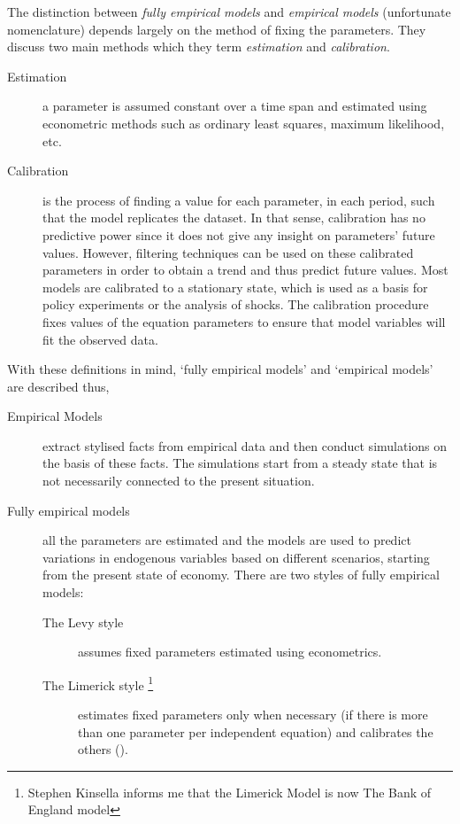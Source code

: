 \documentclass[twoside,a4paper,11pt]{article}
\begin{document}
The distinction between \emph{fully empirical models} and \emph{empirical models} (unfortunate nomenclature) depends largely on the method of fixing the parameters. They discuss two main methods which they term \emph{estimation} and \emph{calibration}. 
\begin{description}
\item[Estimation]{a parameter is assumed constant over a time span and estimated using econometric methods such as ordinary least squares, maximum likelihood, etc.}
\item[Calibration]{is the process of finding a value for each parameter, in each period, such that the model replicates the dataset. In that sense, calibration has no predictive power since it does not give any insight on parameters’ future values. However, filtering techniques can be used on these calibrated parameters in order to obtain a trend and thus predict future values. Most models are calibrated to a stationary state, which is used as a basis for policy experiments or the analysis of shocks.  The calibration procedure fixes values of the equation parameters  to ensure that model variables will fit the observed data.}
\end{description} 
With these definitions in mind, `fully empirical models' and `empirical models' are described thus,
\begin{description}
\item[Empirical Models]{extract stylised facts from empirical data and then conduct simulations on the basis of these facts. The simulations start from a steady state that is not necessarily connected to the present situation.}
\item[Fully empirical models]{all the parameters are estimated and the models are used to predict variations in endogenous variables based on different scenarios, starting from the present state of economy. There are two styles of fully empirical models:}
	\begin{description}
	\item[The Levy style]{assumes fixed parameters estimated using econometrics.}
	\item[The Limerick style \footnote{Stephen Kinsella informs me that the Limerick Model is now The Bank of England model}] {estimates fixed parameters only when necessary (if there is more than one parameter per independent equation) and calibrates the others (\cite{Kinsella2012b}).}
	\end{description} 
\end{description} 
\end{document}
